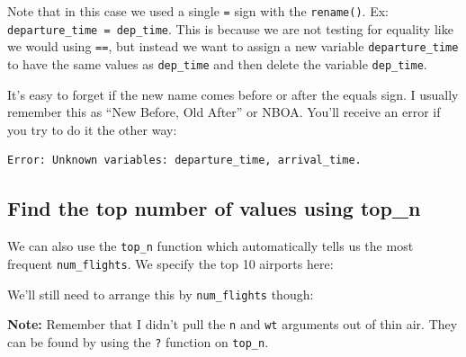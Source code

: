 \documentclass[12pt,]{krantz}
\makeatletter
\newenvironment{Shaded}{\begin{snugshade}}{\end{snugshade}}
\newcommand{\KeywordTok}[1]{\textcolor[rgb]{0.27,0.27,0.27}{\textbf{#1}}}
\newcommand{\DataTypeTok}[1]{\textcolor[rgb]{0.27,0.27,0.27}{#1}}
\newcommand{\DecValTok}[1]{\textcolor[rgb]{0.06,0.06,0.06}{#1}}
\newcommand{\StringTok}[1]{\textcolor[rgb]{0.5,0.5,0.5}{#1}}
\newcommand{\OperatorTok}[1]{\textcolor[rgb]{0.43,0.43,0.43}{\textbf{#1}}}
\newcommand{\NormalTok}[1]{#1}
\newenvironment{kframe}{%
\medskip{}
\setlength{\fboxsep}{.8em}
 \def\at@end@of@kframe{}%
 \ifinner\ifhmode%
  \def\at@end@of@kframe{\end{minipage}}%
  \begin{minipage}{\columnwidth}%
 \fi\fi%
 \def\FrameCommand##1{\hskip\@totalleftmargin \hskip-\fboxsep
 \colorbox{shadecolor}{##1}\hskip-\fboxsep
     \hskip-\linewidth \hskip-\@totalleftmargin \hskip\columnwidth}%
 \MakeFramed {\advance\hsize-\width
   \@totalleftmargin\z@ \linewidth\hsize
   \@setminipage}}%
 {\par\unskip\endMakeFramed%
 \at@end@of@kframe}
\renewenvironment{Shaded}{\begin{kframe}}{\end{kframe}}
\theoremstyle{definition}
\theoremstyle{definition}
\theoremstyle{definition}
\theoremstyle{remark}
\makeatother
\begin{document}
Note that in this case we used a single \texttt{=} sign with the
\texttt{rename()}. Ex: \texttt{departure\_time\ =\ dep\_time}. This is
because we are not testing for equality like we would using \texttt{==},
but instead we want to assign a new variable \texttt{departure\_time} to
have the same values as \texttt{dep\_time} and then delete the variable
\texttt{dep\_time}.

It's easy to forget if the new name comes before or after the equals
sign. I usually remember this as ``New Before, Old After'' or NBOA.
You'll receive an error if you try to do it the other way:

\begin{verbatim}
Error: Unknown variables: departure_time, arrival_time.
\end{verbatim}

\subsection{Find the top number of values using
top\_n}\label{find-the-top-number-of-values-using-top_n}

We can also use the \texttt{top\_n} function which automatically tells
us the most frequent \texttt{num\_flights}. We specify the top 10
airports here:

\begin{Shaded}
\end{Shaded}

We'll still need to arrange this by \texttt{num\_flights} though:

\begin{Shaded}
\end{Shaded}

\textbf{Note:} Remember that I didn't pull the \texttt{n} and
\texttt{wt} arguments out of thin air. They can be found by using the
\texttt{?} function on \texttt{top\_n}.
\end{document}
